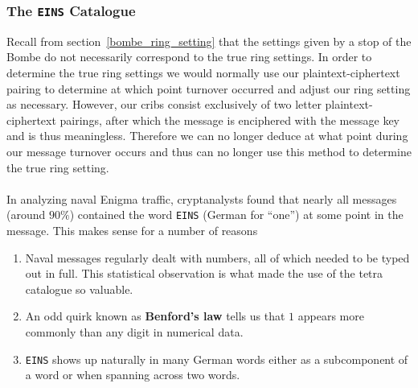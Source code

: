 \subsubsection{The \texttt{EINS} Catalogue}
Recall from section~\ref{bombe_ring_setting} that the settings given by a stop of the Bombe do not necessarily correspond to the true ring settings. In order to determine the true ring settings we would normally use our plaintext-ciphertext pairing to determine at which point turnover occurred and adjust our ring setting as necessary. However, our cribs consist exclusively of two letter plaintext-ciphertext pairings, after which the message is enciphered with the message key and is thus meaningless. Therefore we can no longer deduce at what point during our message turnover occurs and thus can no longer use this method to determine the true ring setting.
\\\\In analyzing naval Enigma traffic, cryptanalysts found that nearly all messages (around $90\%$) contained the word \texttt{EINS} (German for ``one'') at some point in the message. This makes sense for a number of reasons
\begin{enumerate}
	\item Naval messages regularly dealt with numbers, all of which needed to be typed out in full. This statistical observation is what made the use of the tetra catalogue so valuable.
	\item An odd quirk known as {\bf{Benford's law}} tells us that $1$ appears more commonly than any digit in numerical data.
	\item \texttt{EINS} shows up naturally in many German words either as a subcomponent of a word or when spanning across two words.
\end{enumerate}

